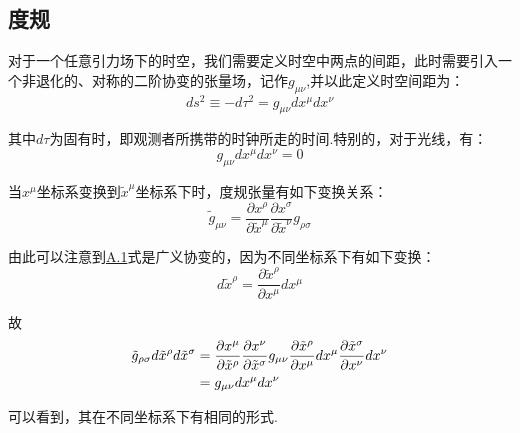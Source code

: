 \documentclass[a4paper]{book}
\begin{document}
\begin{appendix}
\section{度规}
对于一个任意引力场下的时空，我们需要定义时空中两点的间距，此时需要引入一个非退化的、对称的二阶协变的张量场，记作$g_{\mu\nu}$,并以此定义时空间距为：
\begin{equation}\label{A.1}
	ds^{2}\equiv -d\tau^{2}=g_{\mu\nu}dx^{\mu}dx^{\nu}
\end{equation}
\par 
其中$d\tau$为固有时，即观测者所携带的时钟所走的时间.特别的，对于光线，有：
\begin{equation}
	g_{\mu\nu}dx^{\mu}dx^{\nu}=0
\end{equation}\par 
当$x^\mu$坐标系变换到$\tilde{x}^\mu$坐标系下时，度规张量有如下变换关系：
\begin{equation}
 \tilde{g}_{\mu\nu}=\frac{\partial x^{\rho}}{\partial\tilde{x}^{\mu}}\frac{\partial x^{\sigma}}{\partial \tilde{x}^{\nu}} g_{\rho\sigma} 
\end{equation}\par 
由此可以注意到\hyperref[A.1]{A.1}式是广义协变的，因为不同坐标系下有如下变换：
\begin{equation}
	d\tilde{x}^{\rho}=\frac{\partial \tilde{x}^{\rho}}{\partial x^{\mu}} dx^{\mu}
\end{equation}\par 
故
\begin{align}
	\tilde{g}_{\rho\sigma}d\tilde{x}^{\rho}d\tilde{x}^{\sigma}=
	{}& \frac{\partial x^{\mu}}{\partial \tilde{x}^{\rho}}\frac{\partial x^{\nu}}{\partial \tilde{x}^{\sigma}}g_{\mu\nu}\frac{\partial \tilde{x}^{\rho}}{\partial x^{\mu}}dx^{\mu}\frac{\partial \tilde{x}^{\sigma}}{\partial x^{\nu}}dx^{\nu} \notag \\
	={}&  g_{\mu\nu}dx^{\mu}dx^{\nu}
\end{align}\par 
可以看到，其在不同坐标系下有相同的形式.

\end{appendix}
\end{document}
